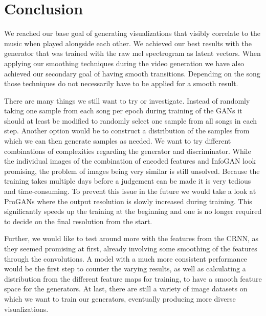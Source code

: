 \chapter{Conclusion}

    We reached our base goal of generating visualizations that visibly correlate to the music when played alongside each other. We achieved our best results with the generator that was trained with the raw mel spectrogram as latent vectors. When applying our smoothing techniques during the video generation we have also achieved our secondary goal of having smooth transitions. Depending on the song those techniques do not necessarily have to be applied for a smooth result.

    There are many things we still want to try or investigate. Instead of randomly taking one sample from each song per epoch during training of the GANs it should at least be modified to randomly select one sample from all songs in each step. Another option would be to construct a distribution of the samples from which we can then generate samples as needed. We want to try different combinations of complexities regarding the generator and discriminator. While the individual images of the combination of encoded features and InfoGAN look promising, the problem of images being very similar is still unsolved. Because the training takes multiple days before a judgement can be made it is very tedious and time-consuming. To prevent this issue in the future we would take a look at ProGANs where the output resolution is slowly increased during training. This significantly speeds up the training at the beginning and one is no longer required to decide on the final resolution from the start.

    Further, we would like to test around more with the features from the CRNN, as they seemed promising at first, already involving some smoothing of the features through the convolutions. A model with a much more consistent performance would be the first step to counter the varying results, as well as calculating a distribution from the different feature maps for training, to have a smooth feature space for the generators. At last, there are still a variety of image datasets on which we want to train our generators, eventually producing more diverse visualizations.